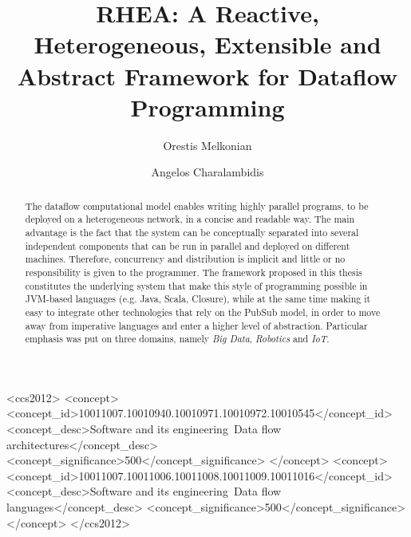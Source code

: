 \documentclass[sigplan,review,anonymous]{acmart}
\begin{document}
\sloppy


\title[RHEA]{RHEA: A Reactive, Heterogeneous, Extensible and Abstract Framework for Dataflow Programming}
\subtitle{}

\author{Orestis Melkonian}

\author{Angelos Charalambidis}

\begin{abstract}
The dataflow computational model enables writing highly
parallel programs, to be deployed on a heterogeneous network, in a concise and
readable way. The main advantage is the fact that the system can be conceptually
separated into several independent components that can be run in parallel and
deployed on different machines. Therefore, concurrency and distribution is
implicit and little or no responsibility is given to the programmer. The
framework proposed in this thesis constitutes the underlying system that make
this style of programming possible in JVM-based languages (e.g. Java, Scala,
Closure), while at the same time making it easy to integrate other technologies
that rely on the PubSub model, in order to move away from imperative languages
and enter a higher level of abstraction. Particular emphasis was put on three
domains, namely \textit{Big Data}, \textit{Robotics} and \textit{IoT}.
\end{abstract}

\begin{CCSXML} <ccs2012> <concept>
<concept_id>10011007.10010940.10010971.10010972.10010545</concept_id>
<concept_desc>Software and its engineering~Data flow
architectures</concept_desc> <concept_significance>500</concept_significance>
</concept> <concept>
<concept_id>10011007.10011006.10011008.10011009.10011016</concept_id>
<concept_desc>Software and its engineering~Data flow languages</concept_desc>
<concept_significance>500</concept_significance> </concept> </ccs2012>
\end{CCSXML}

\end{document}
